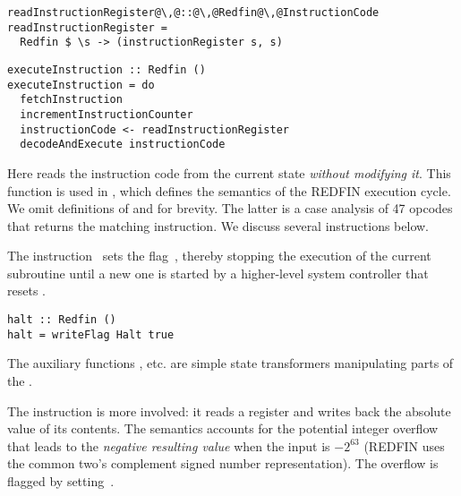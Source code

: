 \begin{verbatim}
readInstructionRegister@\,@::@\,@Redfin@\,@InstructionCode
readInstructionRegister =
  Redfin $ \s -> (instructionRegister s, s)
\end{verbatim}
\begin{verbatim}
executeInstruction :: Redfin ()
executeInstruction = do
  fetchInstruction
  incrementInstructionCounter
  instructionCode <- readInstructionRegister
  decodeAndExecute instructionCode
\end{verbatim}

\noindent
Here  reads the instruction code from the current
state \emph{without modifying it}. This function is used in ,
which defines the semantics of the REDFIN execution cycle. We omit definitions of
 and  for brevity. The latter is a
case analysis of 47 opcodes that returns the matching instruction. We discuss
several instructions below.

The instruction~ sets the flag~, thereby stopping the
execution of the current subroutine until a new one is started by a higher-level
system controller that resets .

\begin{verbatim}
halt :: Redfin ()
halt = writeFlag Halt true
\end{verbatim}

\noindent
The auxiliary functions ,  etc. are simple
state transformers manipulating parts of the .


The instruction  is more involved:
it reads a register and writes back the absolute value of its contents.
The semantics accounts for the potential integer overflow that leads to the
\emph{negative resulting value} when the input is $-2^{63}$ (REDFIN uses the
common two's complement signed number representation). The overflow is flagged
by setting~.

